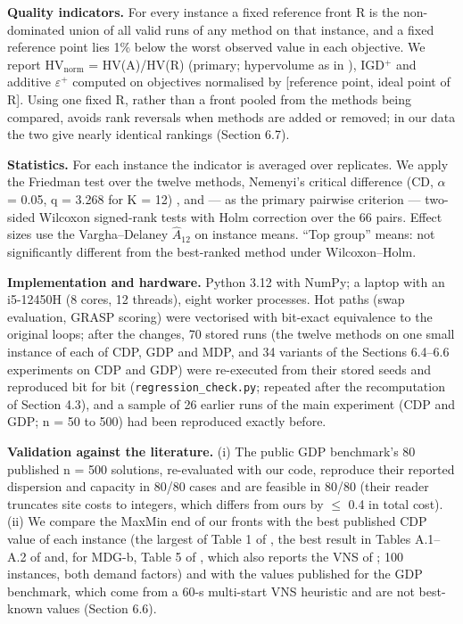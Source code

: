 \textbf{Quality indicators.} For every instance a fixed reference front R is the non-dominated union of all valid runs of any method on that instance, and a fixed reference point lies 1\% below the worst observed value in each objective. We report $\mathrm{HV}_{\mathrm{norm}}$ = HV(A)/HV(R) (primary; hypervolume as in \citet{zitzler2003}), IGD$^{+}$ \citep{ishibuchi2015} and additive $\varepsilon$$^{+}$ \citep{zitzler2003} computed on objectives normalised by [reference point, ideal point of R]. Using one fixed R, rather than a front pooled from the methods being compared, avoids rank reversals when methods are added or removed; in our data the two give nearly identical rankings (Section 6.7).

\textbf{Statistics.} For each instance the indicator is averaged over replicates. We apply the Friedman test over the twelve methods, Nemenyi's critical difference (CD, $\alpha$ = 0.05, q = 3.268 for K = 12) \citep{demsar2006}, and --- as the primary pairwise criterion --- two-sided Wilcoxon signed-rank tests with Holm correction \citep{holm1979} over the 66 pairs. Effect sizes use the Vargha--Delaney $\hat{A}_{12}$ \citep{vargha2000} on instance means. ``Top group'' means: not significantly different from the best-ranked method under Wilcoxon--Holm.

\textbf{Implementation and hardware.} Python 3.12 with NumPy; a laptop with an i5-12450H (8 cores, 12 threads), eight worker processes. Hot paths (swap evaluation, GRASP scoring) were vectorised with bit-exact equivalence to the original loops; after the changes, 70 stored runs (the twelve methods on one small instance of each of CDP, GDP and MDP, and 34 variants of the Sections 6.4--6.6 experiments on CDP and GDP) were re-executed from their stored seeds and reproduced bit for bit (\texttt{regression\_\allowbreak{}check.py}; repeated after the recomputation of Section 4.3), and a sample of 26 earlier runs of the main experiment (CDP and GDP; n = 50 to 500) had been reproduced exactly before. 

\textbf{Validation against the literature.} (i) The public GDP benchmark's 80 published n = 500 solutions, re-evaluated with our code, reproduce their reported dispersion and capacity in 80/80 cases and are feasible in 80/80 (their reader truncates site costs to integers, which differs from ours by $\leq$ 0.4 in total cost). (ii) We compare the MaxMin end of our fronts with the best published CDP value of each instance (the largest of Table 1 of \citet{gomez2026}, the best result in Tables A.1--A.2 of \citet{lu2023} and, for MDG-b, Table 5 of \citet{rosati2024}, which also reports the VNS of \citet{mladenovic2022b}; 100 instances, both demand factors) and with the values published for the GDP benchmark, which come from a 60-s multi-start VNS heuristic and are not best-known values (Section 6.6).
